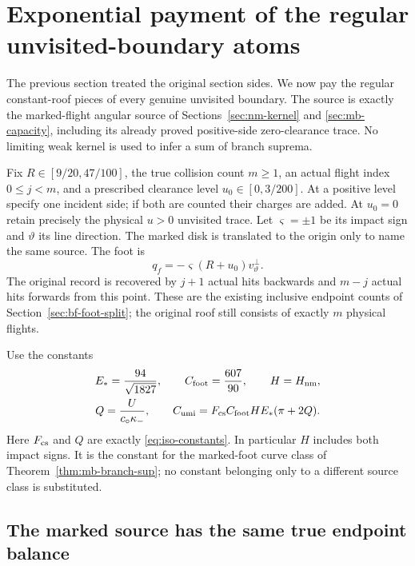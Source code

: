 \section{Exponential payment of the regular unvisited-boundary atoms}
\label{sec:umi-unvisited}

The previous section treated the original section sides. We now
pay the regular constant-roof pieces of every genuine unvisited
boundary. The source is exactly the marked-flight angular source
of Sections~\ref{sec:nm-kernel} and \ref{sec:mb-capacity}, including
its already proved positive-side zero-clearance trace. No limiting
weak kernel is used to infer a sum of branch suprema.

Fix $R\in[9/20,47/100]$, the true collision count $m\ge1$, an
actual flight index $0\le j<m$, and a prescribed clearance level
$u_0\in[0,3/200]$. At a positive level specify one incident side;
if both are counted their charges are added. At $u_0=0$ retain
precisely the physical $u>0$ unvisited trace. Let $\varsigma=\pm1$
be its impact sign and $\vartheta$ its line direction. The marked
disk is translated to the origin only to name the same source.
The foot is
\[
 q_f=-\varsigma(R+u_0)v_\vartheta^\perp.
\]
The original record is recovered by $j+1$ actual hits backwards
and $m-j$ actual hits forwards from this point. These are the
existing inclusive endpoint counts of
Section~\ref{sec:bf-foot-split}; the original roof still consists
of exactly $m$ physical flights.

Use the constants
\begin{equation}\label{eq:umi-constants}
 \begin{gathered}
 E_* =\frac{94}{\sqrt{1827}},\qquad
 C_{\rm foot}=\frac{607}{90},\qquad H=H_{\rm nm},\\
 Q=\frac{U}{c_\circ\kappa_-},\qquad
 C_{\rm umi}=F_{\rm cs}C_{\rm foot}HE_*(\pi+2Q).
 \end{gathered}
\end{equation}
Here $F_{\rm cs}$ and $Q$ are exactly
\eqref{eq:iso-constants}. In particular $H$ includes both impact
signs. It is the constant for the marked-foot curve class of
Theorem~\ref{thm:mb-branch-sup}; no constant belonging only to a
different source class is substituted.

\subsection{The marked source has the same true endpoint balance}

